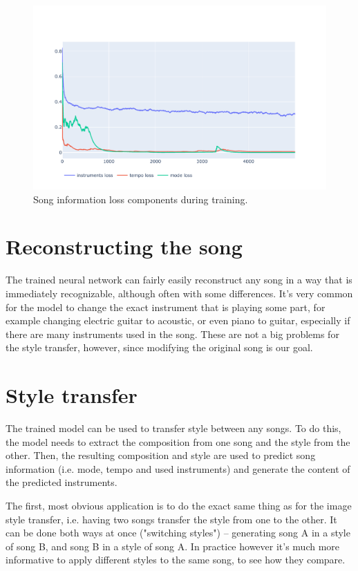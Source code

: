 \documentclass[en]{pracamgr}
\begin{document}
\begin{figure}
    \centering
    \includegraphics[width=\linewidth]{figures/song-info.pdf}
    \caption{Song information loss components during training.}
    \label{fig:song_info}
\end{figure}

\section{Reconstructing the song}

The trained neural network can fairly easily reconstruct any song in a way that is immediately recognizable, although often with some differences.
It's very common for the model to change the exact instrument that is playing some part, for example changing electric guitar to acoustic, or even piano to guitar, especially if there are many instruments used in the song.
These are not a big problems for the style transfer, however, since modifying the original song is our goal.

\section{Style transfer}

The trained model can be used to transfer style between any songs.
To do this, the model needs to extract the composition from one song and the style from the other.
Then, the resulting composition and style are used to predict song information (i.e. mode, tempo and used instruments) and generate the content of the predicted instruments.

The first, most obvious application is to do the exact same thing as for the image style transfer, i.e. having two songs transfer the style from one to the other.
It can be done both ways at once ("switching styles") -- generating song A in a style of song B, and song B in a style of song A.
In practice however it's much more informative to apply different styles to the same song, to see how they compare.
\end{document}
